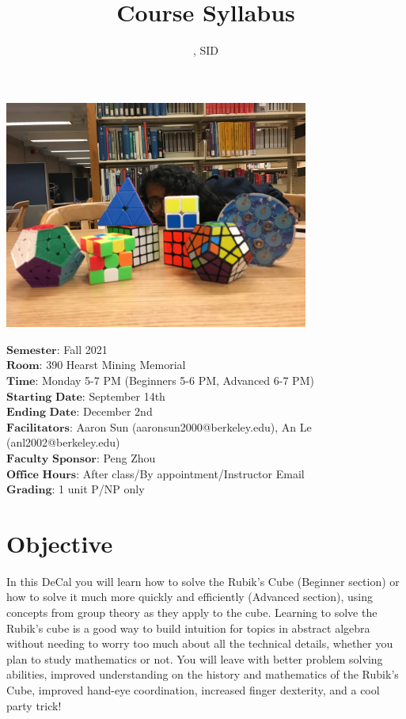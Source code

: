 \documentclass[11pt]{article}
\author{\Name, SID \SID}
\date{}
\begin{document}
\maketitle
\title{Course Syllabus}
\centerline{\includegraphics[width=10cm]{5.JPG}}

$\textbf{Semester}$: Fall 2021\\
$\textbf{Room}$: 390 Hearst Mining Memorial\\
$\textbf{Time}$: Monday 5-7 PM (Beginners 5-6 PM, Advanced 6-7 PM)\\
$\textbf{Starting Date}$: September 14th\\
$\textbf{Ending Date}$: December 2nd\\
$\textbf{Facilitators}$: Aaron Sun (aaronsun2000@berkeley.edu), An Le (anl2002@berkeley.edu) \\
$\textbf{Faculty Sponsor}$: Peng Zhou\\
$\textbf{Office Hours}$: After class/By appointment/Instructor Email \\
$\textbf{Grading}$: 1 unit P/NP only

\section*{Objective}
In this DeCal you will learn how to solve the Rubik’s Cube (Beginner section) or how to solve it much more quickly and efficiently (Advanced section), using concepts from group theory as they apply to the cube. Learning to solve the Rubik's cube is a good way to build intuition for topics in abstract algebra without needing to worry too much about all the technical details, whether you plan to study mathematics or not. You will leave with better problem solving abilities, improved understanding on the history and mathematics of the Rubik’s Cube, improved hand-eye coordination, increased finger dexterity, and a cool party trick!
\end{document}
